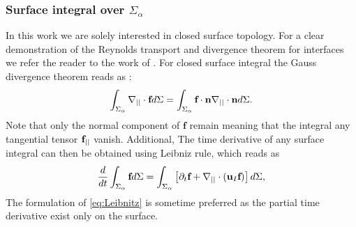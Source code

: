 \subsubsection*{Surface integral over $\Sigma_\alpha$}

In this work we are solely interested in closed surface topology. 
For a clear demonstration of the Reynolds transport and divergence theorem for interfaces we refer the reader to the work of \citet{nadim1996concise}. 
For closed surface integral the Gauss divergence theorem reads as :
\begin{equation}
    \int_{\Sigma_\alpha}  \mathbf{\nabla}_{||}\cdot \textbf{f} d\Sigma
    = 
    \int_{\Sigma_\alpha}  \textbf{f} \cdot \textbf{n}\mathbf{\nabla}_{||}\cdot\textbf{n} d\Sigma. 
    \label{eq:surf_div_theorem}
\end{equation}
Note that only the normal component of $\textbf{f}$ remain meaning that the integral any tangential tensor $\textbf f_{||}$ vanish. 
Additional, The time derivative of any surface integral can then be obtained using Leibniz rule, which reads as  
\begin{equation}
    \frac{d}{dt} \int_{\Sigma_\alpha} \textbf{f} d\Sigma 
    = \int_{\Sigma_\alpha} \left[
        \partial_t \textbf{f} 
        +   \mathbf{\nabla}_{||}\cdot (\textbf{u}_I\textbf{f})
    \right]d\Sigma,
    \label{eq:Leibnitz}
\end{equation}
The formulation of \ref{eq:Leibnitz} is sometime preferred as the partial time derivative exist only on the surface. 



